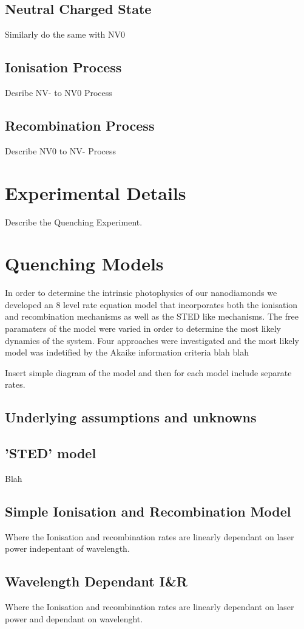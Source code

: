 \documentclass[preprint,prl,twocolumn]{revtex4}
\begin{document}
\subsection{Neutral Charged State}
Similarly do the same with NV0
\subsection{Ionisation Process}
Desribe NV- to NV0 Process
\subsection{Recombination Process}
Describe NV0 to NV- Process

\section{Experimental Details}
Describe the Quenching Experiment.

\section{Quenching Models}
In order to determine the intrinsic photophysics of our nanodiamonds we developed an 8 level rate equation model that incorporates both the ionisation and recombination mechanisms as well as the STED like mechanisms. The free paramaters of the model were varied in order to determine the most likely dynamics of the system. Four approaches were investigated and the most likely model was indetified by the Akaike information criteria blah blah

Insert simple diagram of the model and then for each model include separate rates.

\subsection{Underlying assumptions and unknowns}

\subsection{'STED' model}
Blah
\subsection{Simple Ionisation and Recombination Model}
Where the Ionisation and recombination rates are linearly dependant on laser power indepentant of wavelength.
\subsection{Wavelength Dependant I\&R}
Where the Ionisation and recombination rates are linearly dependant on laser power and dependant on wavelenght.
\end{document}
